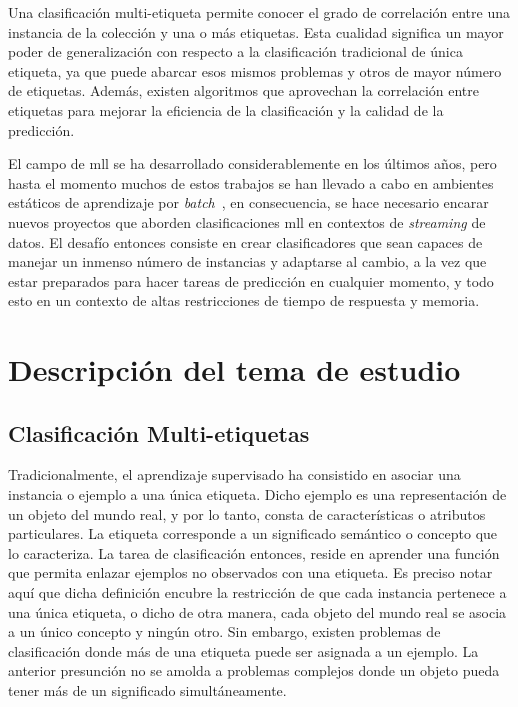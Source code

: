 Una clasificación multi-etiqueta permite conocer el grado de correlación entre
una instancia de la colección y una o más etiquetas. Esta cualidad significa un
mayor poder de generalización con respecto a la clasificación tradicional de
única etiqueta, ya que puede abarcar esos mismos problemas y otros de mayor
número de etiquetas. Además, existen algoritmos que aprovechan la correlación
entre etiquetas para mejorar la eficiencia de la clasificación y la calidad de
la predicción.

El campo de \acrshort{mll} se ha desarrollado considerablemente en los últimos
años, pero hasta el momento muchos de estos trabajos se han llevado a cabo en
ambientes estáticos de aprendizaje por
\textit{batch}~\cite{read_classifier_2011}, en consecuencia, se hace necesario
encarar nuevos proyectos que aborden clasificaciones \acrshort{mll} en contextos
de \textit{streaming} de datos. El desafío entonces consiste en crear
clasificadores que sean capaces de manejar un inmenso número de instancias y
adaptarse al cambio, a la vez que estar preparados para hacer tareas de
predicción en cualquier momento, y todo esto en un contexto de altas
restricciones de tiempo de respuesta y memoria.

\section{Descripción del tema de estudio}

\subsection{Clasificación Multi-etiquetas}
\label{intro_mll}

Tradicionalmente, el aprendizaje supervisado ha consistido en asociar una
instancia o ejemplo a una única etiqueta. Dicho ejemplo es una representación de
un objeto del mundo real, y por lo tanto, consta de características o atributos
particulares. La etiqueta corresponde a un significado semántico o concepto que
lo caracteriza. La tarea de clasificación entonces, reside en aprender una
función que permita enlazar ejemplos no observados con una etiqueta. Es preciso
notar aquí que dicha definición encubre la restricción de que cada instancia
pertenece a una única etiqueta, o dicho de otra manera, cada objeto del mundo
real se asocia a un único concepto y ningún otro. Sin embargo, existen problemas
de clasificación donde más de una etiqueta puede ser asignada a un ejemplo. La
anterior presunción no se amolda a problemas complejos donde un objeto pueda
tener más de un significado simultáneamente.

